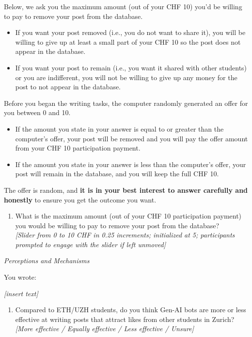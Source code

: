 \documentclass[12pt,notitlepage]{article}
\theoremstyle{plain}
\theoremstyle{plain}
\theoremstyle{definition}
\theoremstyle{definition}
\theoremstyle{assumption}
\theoremstyle{plain}
\theoremstyle{plain}
\theoremstyle{plain}
\theoremstyle{plain}
\theoremstyle{definition}%
\theoremstyle{plain}
\theoremstyle{plain}
\theoremstyle{plain}
\theoremstyle{plain}
\begin{document}
Below, we ask you the maximum amount (out of your CHF 10) you'd be willing to pay to remove your post from the database.

\begin{itemize}
\item If you want your post removed (i.e., you do not want to share it), you will be willing to give up at least a small part of your CHF 10 so the post does not appear in the database.
\item If you want your post to remain (i.e., you want it shared with other students) or you are indifferent, you will not be willing to give up any money for the post to not appear in the database.
\end{itemize}

Before you began the writing tasks, the computer randomly generated an offer for you between 0 and 10.

\begin{itemize}
\item If the amount you state in your answer is equal to or greater than the computer's offer, your post will be removed and you will pay the offer amount from your CHF 10 participation payment.
\item If the amount you state in your answer is less than the computer's offer, your post will remain in the database, and you will keep the full CHF 10.
\end{itemize}

The offer is random, and \textbf{it is in your best interest to answer carefully and honestly} to ensure you get the outcome you want.

\begin{enumerate}
\item What is the maximum amount (out of your CHF 10 participation payment) you would be willing to pay to remove your post from the database?\\
\emph{[Slider from 0 to 10 CHF in 0.25 increments; initialized at 5; participants prompted to engage with the slider if left unmoved]}
\end{enumerate}

\vspace{12pt}
\emph{Perceptions and Mechanisms}

You wrote:

\emph{[insert text]}

\begin{enumerate}
\item Compared to ETH/UZH students, do you think Gen-AI bots are more or less effective at writing posts that attract likes from other students in Zurich?\\
\emph{[More effective / Equally effective / Less effective / Unsure]}
\end{enumerate}
\end{document}
